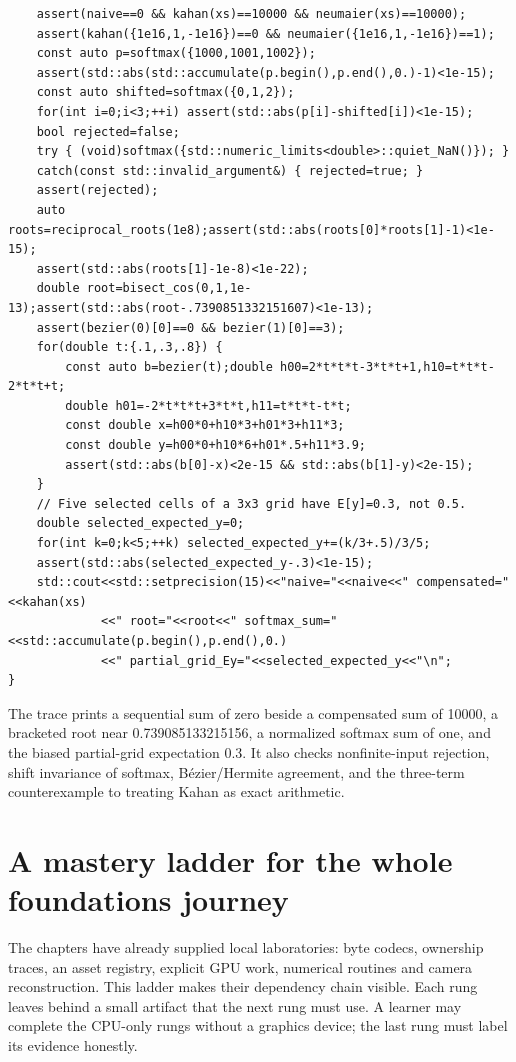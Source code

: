 \begin{verbatim}
    assert(naive==0 && kahan(xs)==10000 && neumaier(xs)==10000);
    assert(kahan({1e16,1,-1e16})==0 && neumaier({1e16,1,-1e16})==1);
    const auto p=softmax({1000,1001,1002});
    assert(std::abs(std::accumulate(p.begin(),p.end(),0.)-1)<1e-15);
    const auto shifted=softmax({0,1,2});
    for(int i=0;i<3;++i) assert(std::abs(p[i]-shifted[i])<1e-15);
    bool rejected=false;
    try { (void)softmax({std::numeric_limits<double>::quiet_NaN()}); }
    catch(const std::invalid_argument&) { rejected=true; }
    assert(rejected);
    auto roots=reciprocal_roots(1e8);assert(std::abs(roots[0]*roots[1]-1)<1e-15);
    assert(std::abs(roots[1]-1e-8)<1e-22);
    double root=bisect_cos(0,1,1e-13);assert(std::abs(root-.7390851332151607)<1e-13);
    assert(bezier(0)[0]==0 && bezier(1)[0]==3);
    for(double t:{.1,.3,.8}) {
        const auto b=bezier(t);double h00=2*t*t*t-3*t*t+1,h10=t*t*t-2*t*t+t;
        double h01=-2*t*t*t+3*t*t,h11=t*t*t-t*t;
        const double x=h00*0+h10*3+h01*3+h11*3;
        const double y=h00*0+h10*6+h01*.5+h11*3.9;
        assert(std::abs(b[0]-x)<2e-15 && std::abs(b[1]-y)<2e-15);
    }
    // Five selected cells of a 3x3 grid have E[y]=0.3, not 0.5.
    double selected_expected_y=0;
    for(int k=0;k<5;++k) selected_expected_y+=(k/3+.5)/3/5;
    assert(std::abs(selected_expected_y-.3)<1e-15);
    std::cout<<std::setprecision(15)<<"naive="<<naive<<" compensated="<<kahan(xs)
             <<" root="<<root<<" softmax_sum="<<std::accumulate(p.begin(),p.end(),0.)
             <<" partial_grid_Ey="<<selected_expected_y<<"\n";
}
\end{verbatim}

The trace prints a sequential sum of zero beside a compensated sum of 10000, a bracketed root near 0.739085133215156, a normalized softmax sum of one, and the biased partial-grid expectation 0.3. It also checks nonfinite-input rejection, shift invariance of softmax, Bézier/Hermite agreement, and the three-term counterexample to treating Kahan as exact arithmetic.

\section{A mastery ladder for the whole foundations journey}\label{02-foundations-ii-ch038-a-mastery-ladder-for-the-whole-foundations-journey}

The chapters have already supplied local laboratories: byte codecs, ownership traces, an asset registry, explicit GPU work, numerical routines and camera reconstruction. This ladder makes their dependency chain visible. Each rung leaves behind a small artifact that the next rung must use. A learner may complete the CPU-only rungs without a graphics device; the last rung must label its evidence honestly.

